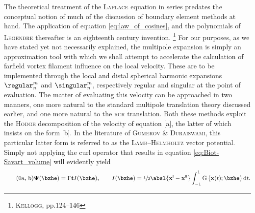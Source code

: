 The theoretical treatment of the \textsc{Laplace} equation in series predates the conceptual notion of much of the discussion of boundary element methods at hand.
The application of equation \eqref{eq:law_of_cosines}, and the polynomials of \textsc{Legendre} thereafter is an eighteenth century invention.%
\footnote{%
  \cite{kellogg1929foundations} \textsc{Kellogg}, pp.124--146
}
For our purposes, as we have stated yet not necessarily explained, the multipole expansion is simply an approximation tool with which we shall attempt to accelerate the calculation of farfield vortex filament influence on the local velocity.
These are to be implemented through the local and distal spherical harmonic expansions $\regular_n^m$ and $\singular_n^m$, respectively regular and singular at the point of evaluation.
The matter of evaluating this velocity can be approached in two manners, one more natural to the standard multipole translation theory discussed earlier, and one more natural to the \textsc{rcr} translation.
Both these methods exploit the \textsc{Hodge} decomposition of the velocity of equation \subeqref{\ref{eq:Helmholtz_decomposition}}[a], the latter of which insists on the form \subeqref{\ref{eq:Helmholtz_decomposition}}[b].
In the literature of \textsc{Gumerov} \& \textsc{Duraiswami}, this particular latter form is referred to as the \textsc{Lamb}--\textsc{Helmholtz} vector potential.
Simply not applying the curl operator that results in equation \eqref{eq:Biot-Savart_volume} will evidently yield
%
\begin{subequations}\label{eq:bPsi_parametrized}
  \begin{equation}\tag{\theequation{a, b}}
    \mathbf{\Psi}(\bzhe) = \Gamma \tvec I(\bzhe), \qquad
    I(\bzhe) = \sfrac{1}{2} \absl{\xvec^{\romani} - \xvec^{\romanii}} \int_{-1}^{1} \green \big( \xvec(t); \bzhe \big) \,\dee t.
  \end{equation}
\end{subequations}

